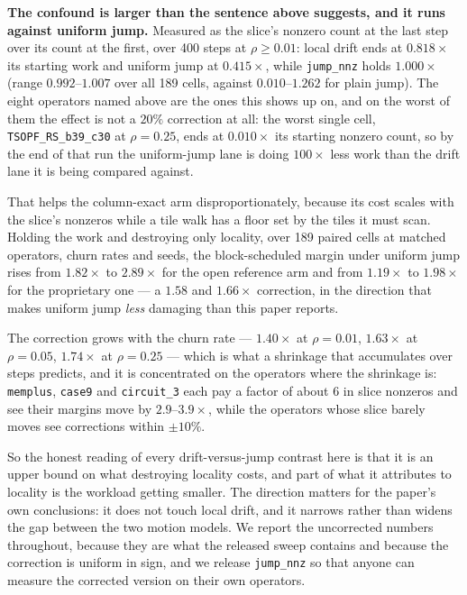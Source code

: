 \documentclass{article}
\begin{document}
\textbf{The confound is larger than the sentence above suggests, and it runs
against uniform jump.} Measured as the slice's nonzero count at the last step
over its count at the first, over 400 steps at $\rho \geq 0.01$: local drift ends
at $0.818\times$ its starting work and uniform jump at $0.415\times$, while
\texttt{jump\_nnz} holds $1.000\times$ (range $0.992$--$1.007$ over all 189
cells, against $0.010$--$1.262$ for plain jump). The eight operators named above are the ones this shows up on, and on the worst
of them the effect is not a $20\%$ correction at all:
the worst single cell, \texttt{TSOPF\_RS\_b39\_c30} at $\rho{=}0.25$, ends at
$0.010\times$ its starting nonzero count, so by the end of that run the
uniform-jump lane is doing $100\times$ less work than the drift lane it is being
compared against.

That helps the column-exact arm disproportionately, because its cost scales with
the slice's nonzeros while a tile walk has a floor set by the tiles it must
scan. Holding the work and destroying only locality, over 189 paired cells at
matched operators, churn rates and seeds, the block-scheduled margin under
uniform jump rises from $1.82\times$ to $2.89\times$ for the open reference arm
and from $1.19\times$ to $1.98\times$ for the proprietary one --- a $1.58$ and
$1.66\times$ correction, in the direction that makes uniform jump \emph{less}
damaging than this paper reports.

The correction grows with the churn rate --- $1.40\times$ at $\rho{=}0.01$,
$1.63\times$ at $\rho{=}0.05$, $1.74\times$ at $\rho{=}0.25$ --- which is what a
shrinkage that accumulates over steps predicts, and it is concentrated on the
operators where the shrinkage is: \texttt{memplus}, \texttt{case9} and
\texttt{circuit\_3} each pay a factor of about $6$ in slice nonzeros and see
their margins move by $2.9$--$3.9\times$, while the operators whose slice
barely moves see corrections within $\pm 10\%$.

So the honest reading of every drift-versus-jump contrast here is that it is an
upper bound on what destroying locality costs, and part of what it attributes to
locality is the workload getting smaller. The direction matters for the paper's
own conclusions: it does not touch local drift, and it narrows rather than widens
the gap between the two motion models. We report the uncorrected numbers
throughout, because they are what the released sweep contains and because the
correction is uniform in sign, and we release \texttt{jump\_nnz} so that anyone
can measure the corrected version on their own operators.
\end{document}
